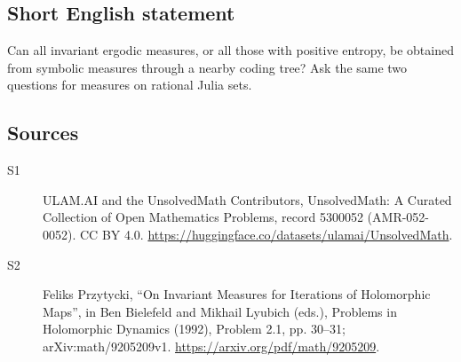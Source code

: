 \documentclass[11pt]{article}
\begin{document}
\subsection{Short English statement}
Can all invariant ergodic measures, or all those with positive entropy, be obtained from symbolic measures through a nearby coding tree? Ask the same two questions for measures on rational Julia sets.
\subsection{Sources}
\begin{description}
\item[\hypertarget{source:5300052:1}{S1}] ULAM.AI and the UnsolvedMath Contributors, UnsolvedMath: A Curated Collection of Open Mathematics Problems, record 5300052 (AMR-052-0052). CC BY 4.0. \url{https://huggingface.co/datasets/ulamai/UnsolvedMath}.
\item[\hypertarget{source:5300052:2}{S2}] Feliks Przytycki, ``On Invariant Measures for Iterations of Holomorphic Maps'', in Ben Bielefeld and Mikhail Lyubich (eds.), Problems in Holomorphic Dynamics (1992), Problem 2.1, pp. 30--31; arXiv:math/9205209v1. \url{https://arxiv.org/pdf/math/9205209}.
\end{description}
\label{end:5300052}
\end{document}
